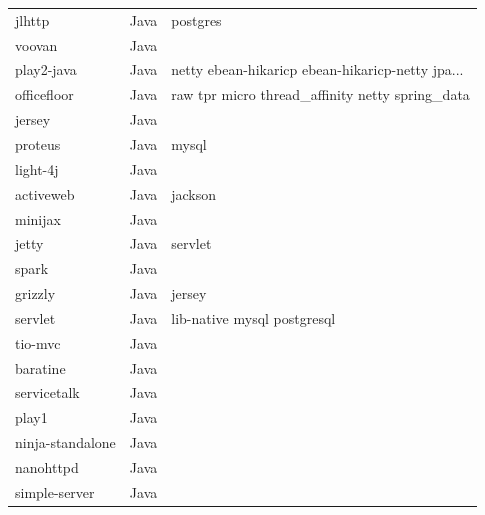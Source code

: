 \begin{longtable}{lll}
    jlhttp           & Java        & postgres                                           \\
    voovan           & Java        &                                                    \\
    play2-java       & Java        & netty ebean-hikaricp ebean-hikaricp-netty jpa...   \\
    officefloor      & Java        & raw tpr micro thread\_affinity netty spring\_data  \\
    jersey           & Java        &                                                    \\
    proteus          & Java        & mysql                                              \\
    light-4j         & Java        &                                                    \\
    activeweb        & Java        & jackson                                            \\
    minijax          & Java        &                                                    \\
    jetty            & Java        & servlet                                            \\
    spark            & Java        &                                                    \\
    grizzly          & Java        & jersey                                             \\
    servlet          & Java        & lib-native mysql postgresql                        \\
    tio-mvc          & Java        &                                                    \\
    baratine         & Java        &                                                    \\
    servicetalk      & Java        &                                                    \\
    play1            & Java        &                                                    \\
    ninja-standalone & Java        &                                                    \\
    nanohttpd        & Java        &                                                    \\
    simple-server    & Java        &                                                    \\

\end{longtable}
